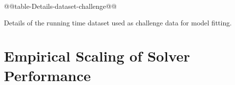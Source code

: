\begin{table*}
\noindent \begin{centering}
@@table-Details-dataset-challenge@@
\par\end{centering}

\caption{\label{tab:Details-dataset-challenge} Details of the running time dataset used as challenge data for model fitting. }
\end{table*}

% 
% 
% 
% 

\section{Empirical Scaling of Solver Performance}

\label{sec:Results}

